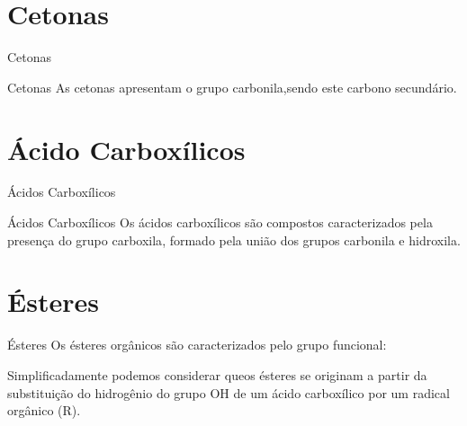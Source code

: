 \documentclass[presentation,professionalfonts,aspectratio=169]{beamer}
\begin{document}
\section{Cetonas}
\label{sec:org7796527}

\begin{frame}[label={sec:org1b55ff4}]{Cetonas}
\begin{mybox}{Cetonas}
As cetonas apresentam o grupo carbonila,sendo este carbono secundário.
\begin{center}
\end{center}
\end{mybox}
\end{frame}


\section{Ácido Carboxílicos}
\label{sec:orgd9ee0aa}
\begin{frame}[label={sec:org7dbfcdc}]{Ácidos Carboxílicos}
\begin{mybox}{Ácidos Carboxílicos}
Os ácidos carboxílicos são compostos caracterizados pela
presença do grupo \alert{carboxila}, formado pela união dos grupos carbonila e hidroxila.


\begin{center}
\end{center}
\end{mybox}
\end{frame}


\section{Ésteres}
\label{sec:org212d1d1}
\begin{mybox}{Ésteres}
Os ésteres orgânicos são caracterizados pelo grupo funcional:
\begin{center}
\end{center}
Simplificadamente podemos considerar queos ésteres
se originam a partir da substituição do hidrogênio do grupo OH de um
ácido carboxílico por um radical orgânico (R).
\end{mybox}
\end{document}
